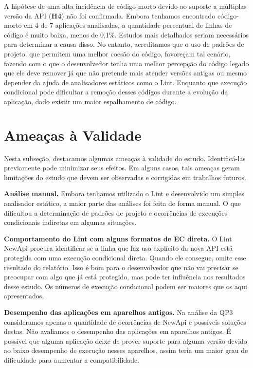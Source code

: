 A hipótese de uma alta incidência de código-morto devido ao suporte a
múltiplas versão da API (\textbf{H4}) não foi confirmada. Embora tenhamos encontrado
código-morto em 4 de 7 aplicações analisadas, a quantidade percentual de linhas de
código é muito baixa,
menos de 0,1\%. Estudos mais detalhados seriam necessários para determinar a causa
disso. No entanto, acreditamos que o uso de padrões de projeto, que permitem uma melhor
coesão do código, favoreçam tal cenário, fazendo com o que o desenvolvedor tenha uma melhor
percepção do código legado que ele deve remover já que não pretende mais atender versões
antigas ou mesmo depender da ajuda de analisadores estáticos como o Lint. Enquanto que
execução condicional pode dificultar a remoção desses códigos durante a evolução da
aplicação, dado existir um maior espalhamento de código.

\section{Ameaças à Validade} \label{sec:ameacas}

Nesta subseção, destacamos algumas ameaças à validade do estudo. Identificá-las
previamente pode minimizar seus efeitos.  Em alguns casos, tais ameaças geram
limitações do estudo que devem ser observadas e corrigidas em trabalhos futuros.

\textbf{Análise manual.} Embora tenhamos utilizado o Lint e desenvolvido um simples
analisador estático, a maior parte das análises foi feita de forma manual. O que
dificultou a determinação de padrões de projeto e ocorrências de execuções condicionais
indiretas em algumas situações.

\textbf{Comportamento do Lint com alguns formatos de EC direta.} O Lint NewApi procura
identificar se a linha que faz uso explícito da nova API está protegida com uma execução
condicional direta. Quando ele consegue, omite esse resultado do relatório. Isso é bom
para o desenvolvedor que não vai precisar se preocupar com algo que já está protegido,
mas pode ter influência nos resultados desse estudo. Os números de execução condicional
podem ser maiores que os aqui apresentados.

\textbf{Desempenho das aplicações em aparelhos antigos.} Na análise da QP3
consideramos apenas a quantidade de ocorrências de NewApi e possíveis soluções
destas. Não avaliamos o desempenho das aplicações em aparelhos antigos. É possível
que alguma aplicação deixe de prover suporte para alguma versão devido ao baixo
desempenho de execução nesses aparelhos, assim teria um maior grau de dificuldade
para aumentar a compatibilidade.

